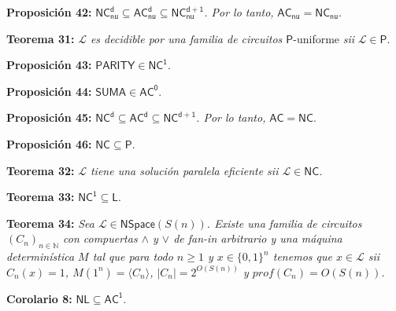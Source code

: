 \documentclass{article}
\begin{document}
\begin{flushleft}
  \textbf{Proposición 42:}
  $\mathsf{NC^d_{nu} \subseteq AC^d_{nu} \subseteq NC^{d+1}_{nu}}$\textit{. Por lo tanto,} $\mathsf{AC_{nu} = 
  NC_{nu}}$.
\end{flushleft}

\begin{flushleft}
  \textbf{Teorema 31:}
  \textit{$\mathcal{L}$ es decidible por una familia de circuitos $\mathsf{P}$}-uniforme \textit{sii} $
  \mathcal{L} \in \mathsf{P}$.
\end{flushleft}

\begin{flushleft}
  \textbf{Proposición 43:}
  $\mathsf{PARITY \in NC^1}$.
\end{flushleft}

\begin{flushleft}
  \textbf{Proposición 44:}
  $\mathsf{SUMA \in AC^0}$.
\end{flushleft}

\begin{flushleft}
  \textbf{Proposición 45:}
  $\mathsf{NC^d \subseteq AC^d \subseteq NC^{d+1}}$\textit{. Por lo tanto,} $\mathsf{AC = NC}$.
\end{flushleft}

\begin{flushleft}
  \textbf{Proposición 46:}
  $\mathsf{NC \subseteq P}$.
\end{flushleft}

\begin{flushleft}
  \textbf{Teorema 32:}
  \textit{$\mathcal{L}$ tiene una solución paralela eficiente sii $\mathcal{L} \in \mathsf{NC}$.}
\end{flushleft}

\begin{flushleft}
  \textbf{Teorema 33:}
  $\mathsf{NC^1 \subseteq L}$.
\end{flushleft}

\begin{flushleft}
  \textbf{Teorema 34:}
  \textit{Sea $\mathcal{L}\in \mathsf{NSpace}(S(n))$. Existe una familia de circuitos $(C_n)_{n \in \mathbb{N}}$ 
  con compuertas $\land$ y $\lor$ de fan-in arbitrario y una máquina determinística $M$ tal que para todo
  $n \geq 1$ y $x \in \{0,1\}^n$ tenemos que $x \in \mathcal{L}$ sii $C_n(x) = 1$, $M (1^n) = \langle C_n \rangle$,
  $|C_n| = 2^{O(S(n))}$ y $prof(C_n) = O(S(n))$.}
\end{flushleft}

\begin{flushleft}
  \textbf{Corolario 8:}
  $\mathsf{NL \subseteq AC^1}$.
\end{flushleft}
\end{document}
